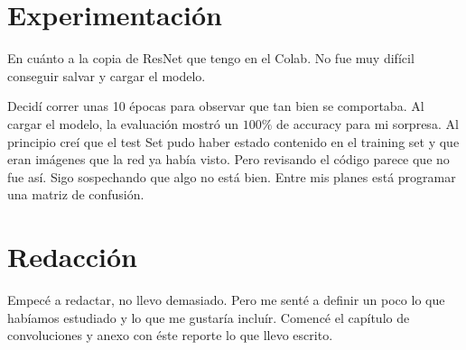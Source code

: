 \documentclass[12pt]{article}
\begin{document}
\section{Experimentación}
En cuánto a la copia de ResNet que tengo en el Colab. No fue muy difícil conseguir salvar y cargar el modelo.

Decidí correr unas 10 épocas para observar que tan bien se comportaba. Al cargar el modelo, la evaluación mostró un $100\%$ de accuracy para mi sorpresa. Al principio creí que el test Set pudo haber estado contenido en el training set y que eran imágenes que la red ya había visto. Pero revisando el código parece que no fue así. Sigo sospechando que algo no está bien. Entre mis planes está programar una matriz de confusión. 

\section{Redacción}
Empecé a redactar, no llevo demasiado. Pero me senté a definir un poco lo que habíamos estudiado y lo que me gustaría incluír. Comencé el capítulo de convoluciones y anexo con éste reporte lo que llevo escrito.


    
\end{document}
